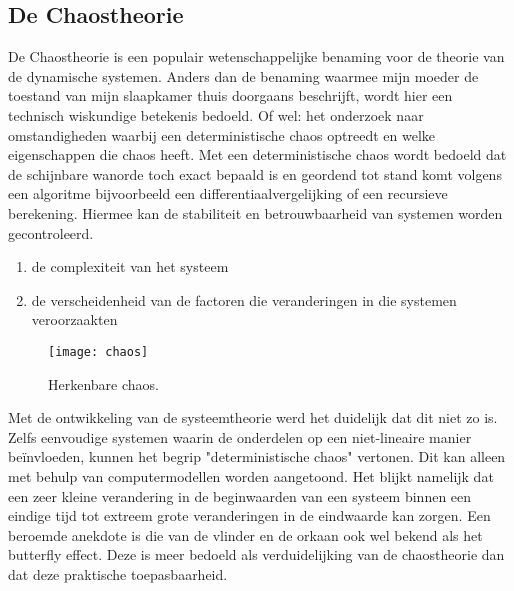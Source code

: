 \documentclass[11pt,fleqn]{book} %
\begin{document}
\subsection{De Chaostheorie}
De Chaostheorie is een populair wetenschappelijke benaming voor de theorie van de dynamische systemen. Anders dan de benaming waarmee mijn moeder de toestand van mijn slaapkamer thuis doorgaans beschrijft, wordt hier een technisch wiskundige betekenis bedoeld. Of wel: het onderzoek naar omstandigheden waarbij een deterministische chaos optreedt en welke eigenschappen die chaos heeft. Met een deterministische chaos wordt bedoeld dat de schijnbare wanorde toch exact bepaald is en geordend tot stand komt volgens een algoritme bijvoorbeeld een differentiaalvergelijking of een recursieve berekening. Hiermee kan de stabiliteit en betrouwbaarheid van systemen worden gecontroleerd.
\begin{enumerate}
\item de complexiteit van het systeem
\item de verscheidenheid van de factoren die veranderingen in die systemen veroorzaakten 
\end{enumerate}
\begin{figure}[h]
	\centering\texttt{[image: chaos]}
	\caption{Herkenbare chaos.}
	\label{fig:chaos}
\end{figure}
Met de ontwikkeling van de systeemtheorie werd het duidelijk dat dit niet zo is. Zelfs eenvoudige systemen waarin de onderdelen op een niet-lineaire manier beïnvloeden, kunnen het begrip "deterministische chaos" vertonen. Dit kan alleen met behulp van computermodellen worden aangetoond. Het blijkt namelijk dat een zeer kleine verandering in de beginwaarden van een systeem binnen een eindige tijd tot extreem grote veranderingen in de eindwaarde kan zorgen. Een beroemde anekdote is die van de vlinder en de orkaan ook wel bekend als het butterfly effect. Deze is meer bedoeld als verduidelijking van de chaostheorie dan dat deze praktische toepasbaarheid.
\end{document}

